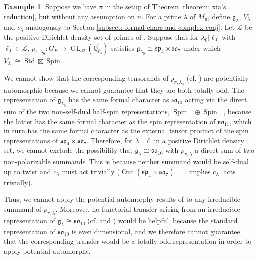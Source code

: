 \documentclass{amsart}
\theoremstyle{definition}
\newtheorem{example}[theorem]{Example}
\numberwithin{equation}{section} %
\newcommand{\GL}{\operatorname{GL}}
\newcommand{\splie}{\mathfrak{sp}}
\newcommand{\solie}{\mathfrak{so}}
\newcommand{\Out}{\operatorname{Out}}
\newcommand{\Std}{\operatorname{Std}}
\newcommand{\Spin}{\operatorname{Spin}}
\newcommand{\Qlzerobar}{\ensuremath{\overline{\mathbb{Q}_{\ell_0}}}}
\newcommand{\mc}[1]{\mathcal{#1}}
\newcommand{\mf}[1]{\mathfrak{#1}}
\begin{document}
\begin{example} \label{example: n=32 fails}
Suppose we have \( \pi \) in the setup of Theorem \ref{theorem: xia's reduction}, but without any assumption on $n$.
For a prime $\lambda$ of $M_\pi$, define $\mf{g}_\lambda$, $V_\lambda$ and $c_\lambda$ analogously to Section \ref{subsect: formal chars and complex conj}.
Let $\mc{L}$ be the positive Dirichlet density set of primes of . Suppose that for $\lambda_0|\ell_0$ with $\ell_0 \in \mathcal{L}$, $\rho_{\pi,\lambda_0}: G_F \to \GL_{32}(\Qlzerobar)$ satisfies $\mf{g}_{\lambda_0} \cong \splie_4 \times \solie_7$ under which $V_{\lambda_0} \cong \Std \boxtimes \Spin$.

We cannot show that the corresponding tensorands of $\rho_{\pi,\lambda_0}$ (cf. ) are potentially automorphic because we cannot guarantee that they are both totally odd.
The representation of $\mf{g}_{\lambda_0}$ has the same formal character as $\solie_{10}$ acting via the direct sum of the two non-self-dual half-spin representations, $\Spin^+ \oplus \Spin^-$, because the latter has the same formal character as the spin representation of $\solie_{11}$, which in turn has the same formal character as the external tensor product of the spin representations of $\solie_4 \times \solie_7$.
Therefore, for \( \lambda\mid \ell \) in a positive Dirichlet density set, we cannot exclude the possibility that $\mf{g}_\lambda \cong \solie_{10}$ with $\rho_{\pi,\lambda}$ a direct sum of two non-polarizable summands. 
This is because neither summand would be self-dual up to twist and $c_\lambda$ must act trivially ($\Out(\splie_4 \times \solie_7)=1$ implies $c_{\lambda_0}$ acts trivially).

Thus, we cannot apply the potential automorphy results of \cite{BLGGT14} to any irreducible summand of $\rho_{\pi,\lambda}$.
Moreover, no functorial transfer arising from an irreducible representation of $\mf{g}_\lambda \cong \solie_{10}$ (cf.  and ) would be helpful, because the standard representation of $\solie_{10}$ is even dimensional, and we therefore cannot guarantee that the corresponding transfer would be a totally odd representation in order to apply potential automorphy.
\end{example}
\end{document}
